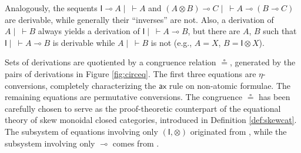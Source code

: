 \documentclass[submission,copyright,creativecommons]{eptcs}
\theoremstyle{definition}
\newcommand{\tl}{\otimes \mathsf{L}}
\newcommand{\ax}{\mathsf{ax}}
\newcommand{\ot}{\otimes}
\newcommand{\lolli}{\multimap}
\newcommand{\I}{\mathsf{I}}
\begin{document}
Analogously, the sequents $\I \lolli A \mid ~ \vdash A$ and $(A \ot B) \lolli C \mid ~ \vdash A \lolli (B \lolli C)$ are derivable, while generally their ``inverses'' are not. Also, a derivation of $A \mid ~ \vdash B$ always yields a derivation of $\I \mid ~ \vdash A \lolli B$, but there are $A$, $B$ such that $\I \mid ~ \vdash A \lolli B$ is derivable while  $A \mid ~ \vdash B$ is not (e.g., $A = X$, $B = \I \ot X$).

Sets of derivations are quotiented by a congruence relation $\circeq$, generated by the pairs of derivations in Figure \ref{fig:circeq}. The first three equations are $\eta$-conversions, completely characterizing the $\ax$ rule on non-atomic formulae. The remaining equations are permutative conversions. The congruence $\circeq$ has been carefully chosen to serve as the proof-theoretic counterpart of the equational theory of skew monoidal closed categories, introduced in Definition \ref{def:skewcat}. The subsystem of equations involving only $(\I,\ot)$ originated from \cite{uustalu:sequent:2021}, while the subsystem involving only $\lolli$ comes from \cite{uustalu:deductive:nodate}.
\end{document}

